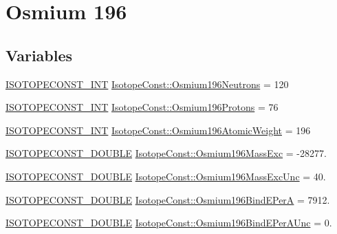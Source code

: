 \hypertarget{group___isotope_const-_osmium-_os196}{}\section{Osmium 196}
\label{group___isotope_const-_osmium-_os196}
\subsection*{Variables}
\begin{DoxyCompactItemize}
\item 
\mbox{\hyperlink{group___isotope_const-_macros_ga5f18360b3e99483a35c32d789e62621c}{I\+S\+O\+T\+O\+P\+E\+C\+O\+N\+S\+T\+\_\+\+I\+NT}} \mbox{\hyperlink{group___isotope_const-_osmium-_os196_ga0423c36326b39e5ca52b46eab9f31c0a}{Isotope\+Const\+::\+Osmium196\+Neutrons}} = 120
\item 
\mbox{\hyperlink{group___isotope_const-_macros_ga5f18360b3e99483a35c32d789e62621c}{I\+S\+O\+T\+O\+P\+E\+C\+O\+N\+S\+T\+\_\+\+I\+NT}} \mbox{\hyperlink{group___isotope_const-_osmium-_os196_gab5f4e233a2db302bd811653d5a327e17}{Isotope\+Const\+::\+Osmium196\+Protons}} = 76
\item 
\mbox{\hyperlink{group___isotope_const-_macros_ga5f18360b3e99483a35c32d789e62621c}{I\+S\+O\+T\+O\+P\+E\+C\+O\+N\+S\+T\+\_\+\+I\+NT}} \mbox{\hyperlink{group___isotope_const-_osmium-_os196_gac0148f1d3b6c4ccdb65df56f4ed95e56}{Isotope\+Const\+::\+Osmium196\+Atomic\+Weight}} = 196
\item 
\mbox{\hyperlink{group___isotope_const-_macros_ga8f45a7272ce02c0b4c65c44636ed719a}{I\+S\+O\+T\+O\+P\+E\+C\+O\+N\+S\+T\+\_\+\+D\+O\+U\+B\+LE}} \mbox{\hyperlink{group___isotope_const-_osmium-_os196_gacddd7164f169caafc19f3fd7210d6ab4}{Isotope\+Const\+::\+Osmium196\+Mass\+Exc}} = -\/28277.
\item 
\mbox{\hyperlink{group___isotope_const-_macros_ga8f45a7272ce02c0b4c65c44636ed719a}{I\+S\+O\+T\+O\+P\+E\+C\+O\+N\+S\+T\+\_\+\+D\+O\+U\+B\+LE}} \mbox{\hyperlink{group___isotope_const-_osmium-_os196_gab90bcaf24d2b92f9965dafe64d06caa1}{Isotope\+Const\+::\+Osmium196\+Mass\+Exc\+Unc}} = 40.
\item 
\mbox{\hyperlink{group___isotope_const-_macros_ga8f45a7272ce02c0b4c65c44636ed719a}{I\+S\+O\+T\+O\+P\+E\+C\+O\+N\+S\+T\+\_\+\+D\+O\+U\+B\+LE}} \mbox{\hyperlink{group___isotope_const-_osmium-_os196_ga0208e0b202f4e12c260ae90edabdad32}{Isotope\+Const\+::\+Osmium196\+Bind\+E\+PerA}} = 7912.
\item 
\mbox{\hyperlink{group___isotope_const-_macros_ga8f45a7272ce02c0b4c65c44636ed719a}{I\+S\+O\+T\+O\+P\+E\+C\+O\+N\+S\+T\+\_\+\+D\+O\+U\+B\+LE}} \mbox{\hyperlink{group___isotope_const-_osmium-_os196_ga435deeca9073235ee04a0b55b73e73b4}{Isotope\+Const\+::\+Osmium196\+Bind\+E\+Per\+A\+Unc}} = 0.

\end{DoxyCompactItemize}
